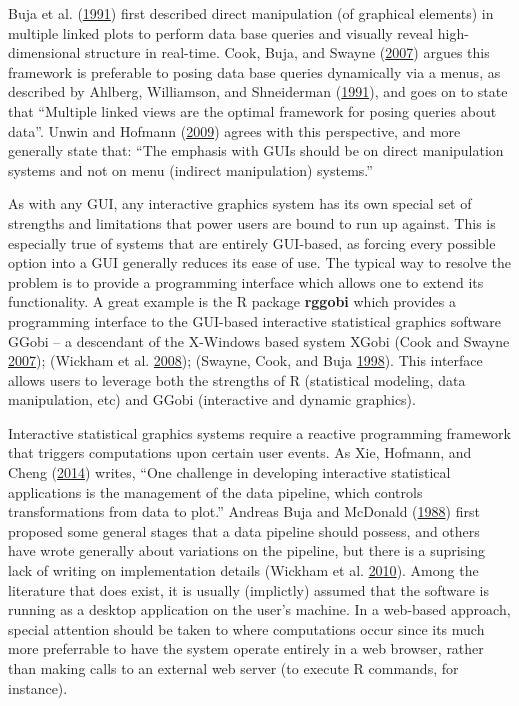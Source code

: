 \documentclass[12pt,]{isuthesis}
\begin{document}
Buja et al. (\protect\hyperlink{ref-Buja:1991vh}{1991}) first described
direct manipulation (of graphical elements) in multiple linked plots to
perform data base queries and visually reveal high-dimensional structure
in real-time. Cook, Buja, and Swayne
(\protect\hyperlink{ref-Cook:2007uk}{2007}) argues this framework is
preferable to posing data base queries dynamically via a menus, as
described by Ahlberg, Williamson, and Shneiderman
(\protect\hyperlink{ref-Ahlberg:1991}{1991}), and goes on to state that
``Multiple linked views are the optimal framework for posing queries
about data''. Unwin and Hofmann
(\protect\hyperlink{ref-Unwin:1999vp}{2009}) agrees with this
perspective, and more generally state that: ``The emphasis with GUIs
should be on direct manipulation systems and not on menu (indirect
manipulation) systems.''

As with any GUI, any interactive graphics system has its own special set
of strengths and limitations that power users are bound to run up
against. This is especially true of systems that are entirely GUI-based,
as forcing every possible option into a GUI generally reduces its ease
of use. The typical way to resolve the problem is to provide a
programming interface which allows one to extend its functionality. A
great example is the R package \textbf{rggobi} which provides a
programming interface to the GUI-based interactive statistical graphics
software GGobi -- a descendant of the X-Windows based system XGobi (Cook
and Swayne \protect\hyperlink{ref-ggobi:2007}{2007}); (Wickham et al.
\protect\hyperlink{ref-rggobi}{2008}); (Swayne, Cook, and Buja
\protect\hyperlink{ref-xgobi}{1998}). This interface allows users to
leverage both the strengths of R (statistical modeling, data
manipulation, etc) and GGobi (interactive and dynamic graphics).

Interactive statistical graphics systems require a reactive programming
framework that triggers computations upon certain user events. As Xie,
Hofmann, and Cheng (\protect\hyperlink{ref-Xie:2014co}{2014}) writes,
``One challenge in developing interactive statistical applications is
the management of the data pipeline, which controls transformations from
data to plot.'' Andreas Buja and McDonald
(\protect\hyperlink{ref-viewing-pipeline}{1988}) first proposed some
general stages that a data pipeline should possess, and others have
wrote generally about variations on the pipeline, but there is a
suprising lack of writing on implementation details (Wickham et al.
\protect\hyperlink{ref-plumbing}{2010}). Among the literature that does
exist, it is usually (implictly) assumed that the software is running as
a desktop application on the user's machine. In a web-based approach,
special attention should be taken to where computations occur since its
much more preferrable to have the system operate entirely in a web
browser, rather than making calls to an external web server (to execute
R commands, for instance).
\end{document}
